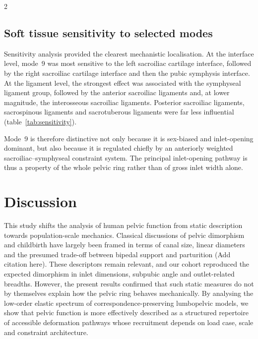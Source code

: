 \documentclass[openacc]{rsproca_new}
\begin{document}
\begin{multicols}{2}
\subsection{Soft tissue sensitivity to selected modes}

Sensitivity analysis provided the clearest mechanistic localisation. At the interface level, mode~9 was most sensitive to the left sacroiliac cartilage interface, followed by the right sacroiliac cartilage interface and then the pubic symphysis interface. At the ligament level, the strongest effect was associated with the symphyseal ligament group, followed by the anterior sacroiliac ligaments and, at lower magnitude, the interosseous sacroiliac ligaments. Posterior sacroiliac ligaments, sacrospinous ligaments and sacrotuberous ligaments were far less influential (table~\ref{tab:sensitivity}).

Mode~9 is therefore distinctive not only because it is sex-biased and inlet-opening dominant, but also because it is regulated chiefly by an anteriorly weighted sacroiliac--symphyseal constraint system. The principal inlet-opening pathway is thus a property of the whole pelvic ring rather than of gross inlet width alone.

\section{Discussion}

This study shifts the analysis of human pelvic function from static description towards population-scale mechanics. Classical discussions of pelvic dimorphism and childbirth have largely been framed in terms of canal size, linear diameters and the presumed trade-off between bipedal support and parturition (Add citation here). These descriptors remain relevant, and our cohort reproduced the expected dimorphism in inlet dimensions, subpubic angle and outlet-related breadths. However, the present results confirmed that such static measures do not by themselves explain how the pelvic ring behaves mechanically. By analysing the low-order elastic spectrum of correspondence-preserving lumbopelvic models, we show that pelvic function is more effectively described as a structured repertoire of accessible deformation pathways whose recruitment depends on load case, scale and constraint architecture.


\end{multicols}
\end{document}
